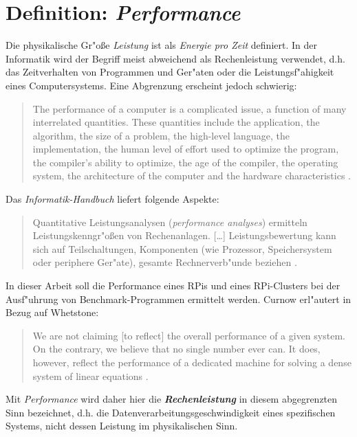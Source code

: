 \section{Definition: \textit{Performance}}\label{Performance}

Die physikalische Gr"o\ss e \textit{Leistung} ist als \textit{Energie pro Zeit} definiert. In der Informatik wird der Begriff meist abweichend als Rechenleistung verwendet, d.h. das Zeitverhalten von Programmen und Ger"aten oder die Leistungsf"ahigkeit eines Computersystems. Eine Abgrenzung erscheint jedoch schwierig: 
\begin{quote}
\onehalfspacing
The performance of a computer is a complicated issue, a function of many interrelated quantities. These quantities include the application, the algorithm, the size of a problem, the high-level language, the implementation, the human level of effort used to optimize the program, the compiler's ability to optimize, the age of the compiler, the operating system, the architecture of the computer and the hardware characteristics \cite{don03}.
\end{quote}
Das \textit{Informatik-Handbuch} liefert folgende Aspekte:
\begin{quote} 
\onehalfspacing
Quantitative Leistungsanalysen (\textit{performance analyses}) ermitteln Leistungskenngr"o\ss en von Rechenanlagen. [\dots] Leistungsbewertung kann sich auf Teilschaltungen, Komponenten (wie Prozessor, Speichersystem oder periphere Ger"ate), gesamte Rechnerverb"unde beziehen \cite{rec06}.
\end{quote}
In dieser Arbeit soll die Performance eines RPis und eines RPi-Clusters bei der Ausf"uhrung von Benchmark-Programmen ermittelt werden. Curnow erl"autert in Bezug auf Whetstone: 
\begin{quote}
\onehalfspacing
We are not claiming [to reflect] the overall performance of a given system. On the contrary, we believe that no single number ever can. It does, however, reflect the performance of a dedicated machine for solving a dense system of linear equations \cite{cur76}.
\end{quote}
Mit \textit{Performance} wird daher hier die \textbf{\textit{Rechenleistung}} in diesem abgegrenzten Sinn bezeichnet, d.h. die Datenverarbeitungsgeschwindigkeit eines spezifischen Systems, nicht dessen Leistung im physikalischen Sinn. 

